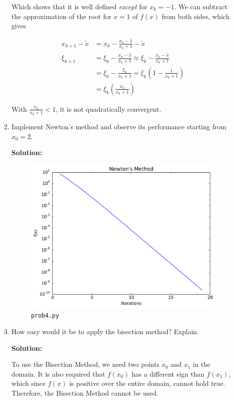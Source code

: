 \documentclass[12pt]{article}
\begin{document}
\begin{enumerate}
\begin{enumerate}
Which shows that it is well defined {\em except} for $x_{k} = -1$. We can subtract the approximation
of the root for $x = 1$ of $f(x)$ from both sides, which gives

\begin{align*}
x_{k+1} - \widetilde{x} &= x_{k} - \frac{x_{k} - 1}{x_{k} + 1} - \widetilde{x}\\
\xi_{k+1} &= \xi_{k} - \frac{x_{k}-1}{x_{k}+1} \approx \xi_{k} - \frac{x_{k} - \widetilde{x}}{x_{k}+1}\\
          &= \xi_{k} - \frac{\xi_{k}}{x_{k}+1} = \xi_{k} \left( 1 - \frac{1}{x_{k}+1}\right)\\
          &= \xi_{k}\left( \frac{x_{k}}{x_{k}+1}\right)
\end{align*}

With $\frac{x_{k}}{x_{k}+1} < 1$, it is not quadratically convergent.

\item Implement Newton's method and observe its performance starting from $x_{0} = 2$.

{\bf Solution:}

\begin{figure}[H]
\centering
\includegraphics[width = .65\textwidth]{hw2_prob4.pdf}
\caption{{\tt prob4.py}}
\end{figure}

\item How easy would it be to apply the bisection method? Explain.

{\bf Solution:}

To use the Bisection Method, we need two points $x_{0}$ and $x_{1}$ in the domain.
It is also required that $f\left(x_{0}\right)$ has a different sign than $f\left(x_{1}\right)$,
which since $f(x)$ is positive over the entire domain, cannot hold true. Therefore, the Bisection Method
cannot be used.

\end{enumerate}


\end{enumerate}
\end{document}
